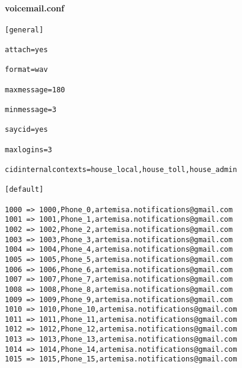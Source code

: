 \documentclass[a4paper,12pt]{report}
\newenvironment{myscriptlisting}
{\begin{list}{}{\setlength{\leftmargin}{1em}}\item\scriptsize\bfseries}
{\end{list}}
\begin{document}
\paragraph{voicemail.conf}
\begin{myscriptlisting}
\begin{verbatim}
[general] 

attach=yes 

format=wav 

maxmessage=180 

minmessage=3 

saycid=yes 

maxlogins=3 

cidinternalcontexts=house_local,house_toll,house_admin 

[default]

1000 => 1000,Phone_0,artemisa.notifications@gmail.com
1001 => 1001,Phone_1,artemisa.notifications@gmail.com
1002 => 1002,Phone_2,artemisa.notifications@gmail.com
1003 => 1003,Phone_3,artemisa.notifications@gmail.com
1004 => 1004,Phone_4,artemisa.notifications@gmail.com
1005 => 1005,Phone_5,artemisa.notifications@gmail.com
1006 => 1006,Phone_6,artemisa.notifications@gmail.com
1007 => 1007,Phone_7,artemisa.notifications@gmail.com
1008 => 1008,Phone_8,artemisa.notifications@gmail.com
1009 => 1009,Phone_9,artemisa.notifications@gmail.com
1010 => 1010,Phone_10,artemisa.notifications@gmail.com
1011 => 1011,Phone_11,artemisa.notifications@gmail.com
1012 => 1012,Phone_12,artemisa.notifications@gmail.com
1013 => 1013,Phone_13,artemisa.notifications@gmail.com
1014 => 1014,Phone_14,artemisa.notifications@gmail.com
1015 => 1015,Phone_15,artemisa.notifications@gmail.com
\end{verbatim}
\end{myscriptlisting}
\end{document}
